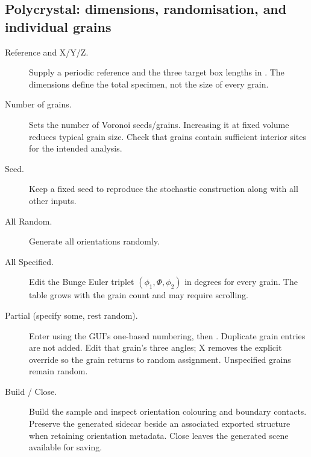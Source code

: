 \subsection{Polycrystal: dimensions, randomisation, and individual grains}
\begin{description}
\item[Reference and X/Y/Z.] Supply a periodic reference and the three target box lengths in \angstrom. The dimensions define the total specimen, not the size of every grain.
\item[Number of grains.] Sets the number of Voronoi seeds/grains. Increasing it at fixed volume reduces typical grain size. Check that grains contain sufficient interior sites for the intended analysis.
\item[Seed.] Keep a fixed seed to reproduce the stochastic construction along with all other inputs.
\item[All Random.] Generate all orientations randomly.
\item[All Specified.] Edit the Bunge Euler triplet $(\phi_1,\Phi,\phi_2)$ in degrees for every grain. The table grows with the grain count and may require scrolling.
\item[Partial (specify some, rest random).] Enter  using the GUI's one-based numbering, then . Duplicate grain entries are not added. Edit that grain's three angles; X removes the explicit override so the grain returns to random assignment. Unspecified grains remain random.
\item[Build / Close.] Build the sample and inspect orientation colouring and boundary contacts. Preserve the generated  sidecar beside an associated exported structure when retaining orientation metadata. Close leaves the generated scene available for saving.
\end{description}

